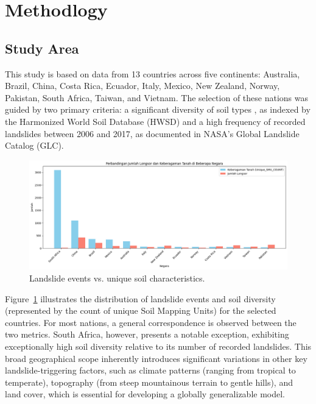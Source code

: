 \section{Methodlogy}

\subsection{Study Area}
This study is based on data from 13 countries across five continents: Australia, Brazil, China, Costa Rica, Ecuador, Italy, Mexico, New Zealand, Norway, Pakistan, South Africa, Taiwan, and Vietnam. The selection of these nations was guided by two primary criteria: a significant diversity of soil types , as indexed by the Harmonized World Soil Database (HWSD) and a high frequency of recorded landslides between 2006 and 2017, as documented in NASA's Global Landslide Catalog (GLC).
\begin{figure}[htbp]
    \centerline{\includegraphics[width=\linewidth]{fig1.png}}
    \caption{Landslide events vs. unique soil characteristics.}
    \label{fig:landslide-soil-distribution}
\end{figure}
Figure~\ref{fig:landslide-soil-distribution} illustrates the distribution of landslide events and soil diversity (represented by the count of unique Soil Mapping Units) for the selected countries. For most nations, a general correspondence is observed between the two metrics. South Africa, however, presents a notable exception, exhibiting exceptionally high soil diversity relative to its number of recorded landslides. This broad geographical scope inherently introduces significant variations in other key landslide-triggering factors, such as climate patterns (ranging from tropical to temperate), topography (from steep mountainous terrain to gentle hills), and land cover, which is essential for developing a globally generalizable model.


